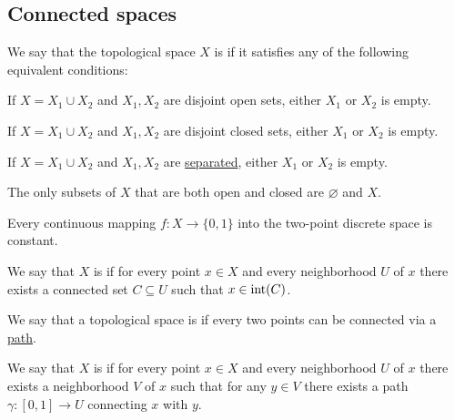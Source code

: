 \subsection{Connected spaces}\label{subsec:connected_sets}

\begin{definition}\label{def:connected_space}\mcite\cite[thm. 6.1.1]{Engelking1989}
  We say that the topological space \( X \) is  if it satisfies any of the following equivalent conditions:
  \begin{thmenum}
     If \( X = X_1 \cup X_2 \) and \( X_1, X_2 \) are disjoint open sets, either \( X_1 \) or \( X_2 \) is empty.

     If \( X = X_1 \cup X_2 \) and \( X_1, X_2 \) are disjoint closed sets, either \( X_1 \) or \( X_2 \) is empty.

     If \( X = X_1 \cup X_2 \) and \( X_1, X_2 \) are \hyperref[def:topological_space_separation]{separated}, either \( X_1 \) or \( X_2 \) is empty.

     The only subsets of \( X \) that are both open and closed are \( \varnothing \) and \( X \).

     Every continuous mapping \( f: X \to \{ 0, 1 \} \) into the two-point discrete space is constant.
  \end{thmenum}
\end{definition}

\begin{definition}\label{def:locally_connected}\mcite\cite[exer. 6.3.3]{Engelking1989}
  We say that \( X \) is  if for every point \( x \in X \) and every neighborhood \( U \) of \( x \) there exists a connected set \( C \subseteq U \) such that \( x \in \operatorname{int}(C) \).
\end{definition}

\begin{definition}\label{def:path_connected}\mcite\cite[exer. 6.3.9]{Engelking1989}
  We say that a topological space is  if every two points can be connected via a \hyperref[def:parametric_curve]{path}.
\end{definition}

\begin{definition}\label{def:locally_path_connected}\mcite\cite[exer. 6.3.10]{Engelking1989}
  We say that \( X \) is  if for every point \( x \in X \) and every neighborhood \( U \) of \( x \) there exists a neighborhood \( V \) of \( x \) such that for any \( y \in V \) there exists a path \( \gamma: [0, 1] \to U \) connecting \( x \) with \( y \).
\end{definition}


